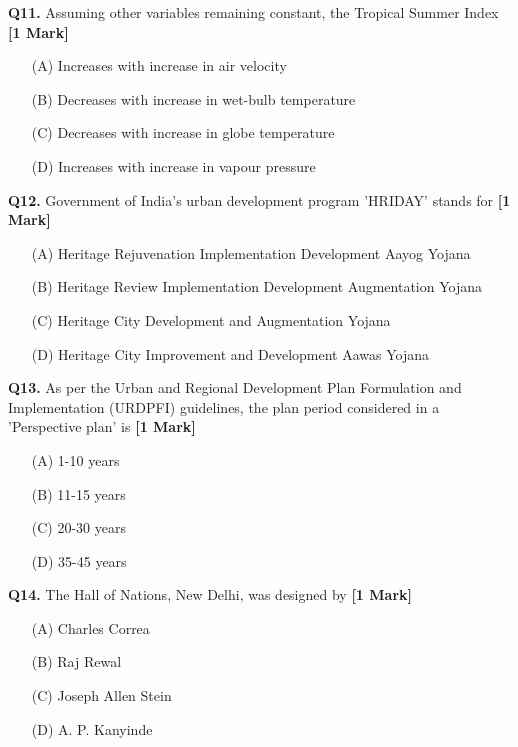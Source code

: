 \documentclass[11pt]{article}
\newcommand{\questiona}[2]{
    \noindent\textbf{Q#2.} #1 \hfill \textbf{[1 Mark]}
}
\begin{document}
\questiona{Assuming other variables remaining constant, the Tropical Summer Index}{11}
\begin{enumerate}
    \item[(A)] Increases with increase in air velocity  
    \item[(B)] Decreases with increase in wet-bulb temperature  
    \item[(C)] Decreases with increase in globe temperature  
    \item[(D)] Increases with increase in vapour pressure  
\end{enumerate}
\vspace{0.5cm}

\questiona{Government of India's urban development program 'HRIDAY' stands for}{12}
\begin{enumerate}
    \item[(A)] Heritage Rejuvenation Implementation Development Aayog Yojana  
    \item[(B)] Heritage Review Implementation Development Augmentation Yojana  
    \item[(C)] Heritage City Development and Augmentation Yojana  
    \item[(D)] Heritage City Improvement and Development Aawas Yojana  
\end{enumerate}
\vspace{0.5cm}

\questiona{As per the Urban and Regional Development Plan Formulation and Implementation (URDPFI) guidelines, the plan period considered in a 'Perspective plan' is}{13}
\begin{enumerate}
    \item[(A)] 1-10 years  
    \item[(B)] 11-15 years  
    \item[(C)] 20-30 years  
    \item[(D)] 35-45 years  
\end{enumerate}
\vspace{0.5cm}

\questiona{The Hall of Nations, New Delhi, was designed by}{14}
\begin{enumerate}
    \item[(A)] Charles Correa  
    \item[(B)] Raj Rewal  
    \item[(C)] Joseph Allen Stein  
    \item[(D)] A. P. Kanyinde  
\end{enumerate}
\vspace{0.5cm}
\end{document}
